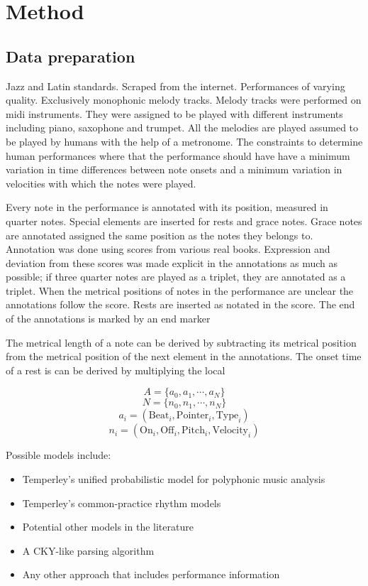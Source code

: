 \section{Method}
\label{sec:method}

\subsection{Data preparation}

Jazz and Latin standards. Scraped from the internet. Performances of varying quality. Exclusively monophonic melody tracks. Melody tracks were performed on midi instruments. They were assigned to be played with different instruments including piano, saxophone and trumpet. All the melodies are played assumed to be played by humans with the help of a metronome. The constraints to determine human performances where that the performance should have have a minimum variation in time differences between note onsets and a minimum variation in velocities with which the notes were played.

Every note in the performance is annotated with its position, measured in quarter notes. Special elements are inserted for rests and grace notes. Grace notes are annotated assigned the same position as the notes they belongs to. Annotation was done using scores from various real books. Expression and deviation from these scores was made explicit in the annotations as much as possible; if three quarter notes are played as a triplet, they are annotated as a triplet. When the metrical positions of notes in the performance are unclear the annotations follow the score. Rests are inserted as notated in the score. The end of the annotations is marked by an end marker

The metrical length of a note can be derived by subtracting its metrical position from the metrical position of the next element in the annotations. The onset time of a rest is can be derived by multiplying the local 

\[A = \{a_0, a_1, \cdots, a_N\}\]
\[N = \{n_0, n_1, \cdots, n_N\}\]
\[a_i = (\mathrm{Beat}_i, \mathrm{Pointer}_i, \mathrm{Type}_i)\]
\[n_i = (\mathrm{On}_i, \mathrm{Off}_i, \mathrm{Pitch}_i, \mathrm{Velocity}_i)\]


Possible models include:
\begin{itemize}
\item Temperley's unified probabilistic model for polyphonic music analysis
\item Temperley's common-practice rhythm models
\item Potential other models in the literature
\item A CKY-like parsing algorithm 
\item Any other approach that includes performance information
\end{itemize}

